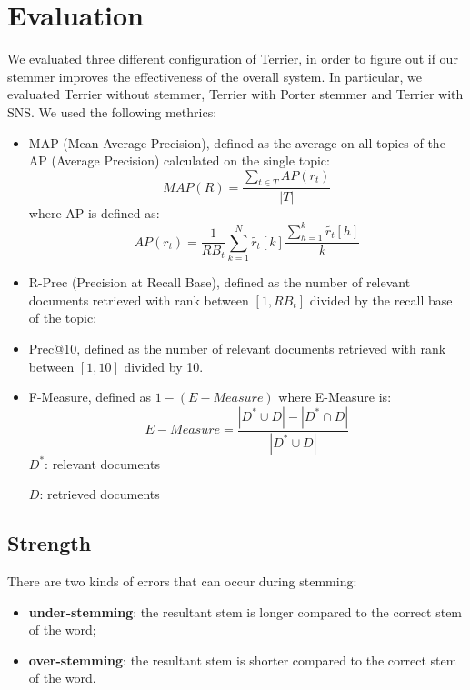 \section{Evaluation}
We evaluated three different configuration of Terrier, in order to figure out if our stemmer improves the effectiveness of the overall system. In particular, we evaluated Terrier without stemmer, Terrier with Porter stemmer and Terrier with SNS. We used the following methrics:

\begin{itemize}
\item MAP (Mean Average Precision), defined as the average on all topics of the AP (Average Precision) calculated on the single topic:
\begin{equation}
MAP(R) = \frac{\sum_{t \in T}AP(r_t)}{|T|}
\end{equation}
where AP is defined as:
\begin{equation}
AP(r_t)=\frac{1}{RB_t}\sum_{k=1}^{N}\widetilde{r_t}[k]\frac{\sum_{h=1}^{k}\widetilde{r_t}[h]}{k}
\end{equation}

\item R-Prec (Precision at Recall Base), defined as the number of relevant documents retrieved with rank between $[1,RB_t]$ divided by the recall base of the topic;

\item Prec@10, defined as the number of relevant documents retrieved with rank between $[1, 10]$ divided by 10.

\item F-Measure, defined as $1 - (E-Measure)$ where E-Measure is:
\begin{equation}
E-Measure=\frac{|D^{*}\cup D|-|D^{*}\cap D|}{|D^{*}\cup D|}
\end{equation}
$D^{*}$: relevant documents

$D$: retrieved documents

\end{itemize}

\subsection{Strength}
There are two kinds of errors that can occur during stemming:

\begin{itemize}
\item \textbf{under-stemming}: the resultant stem is longer compared to the correct stem of the word;
\item \textbf{over-stemming}: the resultant stem is shorter compared to the correct stem of the word.
\end{itemize}

